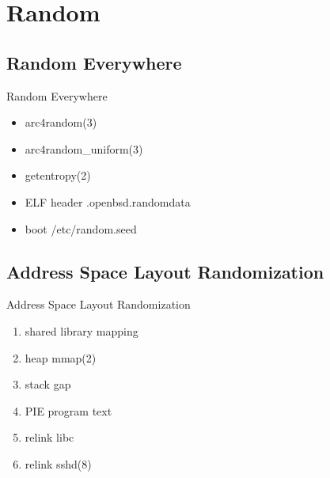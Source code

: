 \documentclass[14pt,aspectratio=169]{beamer}
\begin{document}
\section{Random}

\subsection{Random Everywhere}
\begin{frame}{Random Everywhere}
\begin{itemize}
  \item arc4random(3)
  \item arc4random\_uniform(3)
  \item getentropy(2)
  \item ELF header .openbsd.randomdata
  \item boot /etc/random.seed
\end{itemize}
\end{frame}

\subsection{Address Space Layout Randomization}
\begin{frame}{Address Space Layout Randomization}
\begin{enumerate}
  \item shared library mapping
  \item heap mmap(2)
  \item stack gap
  \item PIE program text
  \item relink libc
  \item relink sshd(8)
\end{enumerate}
\end{frame}
\end{document}
